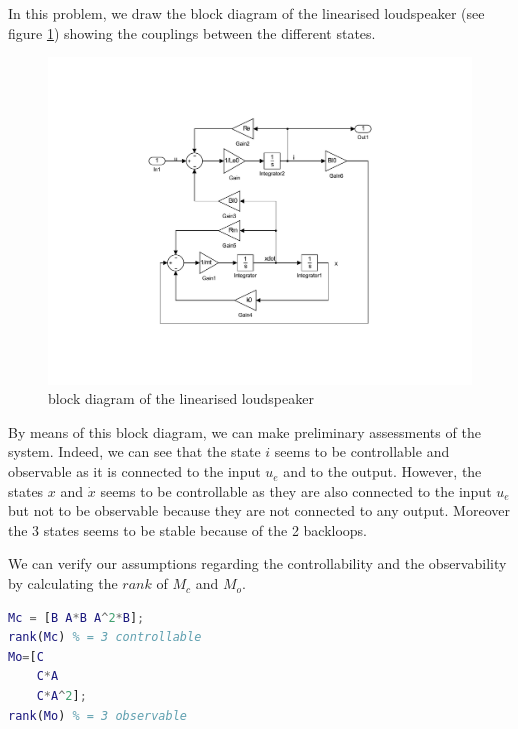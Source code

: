 In this problem, we draw the block diagram of the linearised loudspeaker (see figure \ref{fig:linearModel}) showing the couplings between the different states.

\begin{figure}[H]
 \centering 
 \includegraphics[trim=5cm 3cm 2cm 3cm, clip=true, totalheight=0.5\textheight, angle=0]{figures/linearModel.pdf}
 \caption{block diagram of the linearised loudspeaker}
\label{fig:linearModel}
\end{figure}

By means of this block diagram, we can make preliminary assessments of the system. Indeed, we can see that the state $i$ seems to be controllable and observable as it is connected to the input $u_e$ and to the output. However, the states $x$ and $\dot{x}$ seems to be controllable as they are also connected to the input $u_e$ but not to be observable because they are not connected to any output. Moreover the 3 states seems to be stable because of the 2 backloops.

We can verify our assumptions regarding the controllability and the observability by calculating the $rank$ of $M_c$ and $M_o$.
\begin{lstlisting}[language=Matlab]
Mc = [B A*B A^2*B];
rank(Mc) % = 3 controllable
Mo=[C
    C*A
    C*A^2];
rank(Mo) % = 3 observable
\end{lstlisting}


